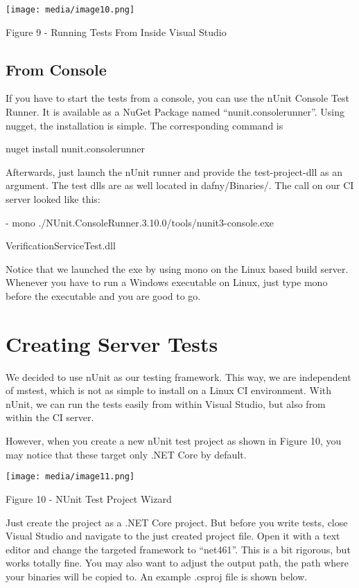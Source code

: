 \documentclass[]{book}
\begin{document}
\texttt{[image: media/image10.png]}

Figure 9 - Running Tests From Inside Visual Studio

\subsection{From Console}\label{from-console}

If you have to start the tests from a console, you can use the nUnit Console Test Runner. It is available as a NuGet Package named ``nunit.consolerunner''. Using nugget, the installation is simple. The corresponding command is

nuget install nunit.consolerunner

Afterwards, just launch the nUnit runner and provide the test-project-dll as an argument. The test dlls are as well located in dafny/Binaries/. The call on our CI server looked like this:

- mono ./NUnit.ConsoleRunner.3.10.0/tools/nunit3-console.exe

VerificationServiceTest.dll

Notice that we launched the exe by using mono on the Linux based build server. Whenever you have to run a Windows executable on Linux, just type mono before the executable and you are good to go.

\section{Creating Server Tests}\label{creating-server-tests}

We decided to use nUnit as our testing framework. This way, we are independent of mstest, which is not as simple to install on a Linux CI environment. With nUnit, we can run the tests easily from within Visual Studio, but also from within the CI server.

However, when you create a new nUnit test project as shown in Figure 10, you may notice that these target only .NET Core by default.

\texttt{[image: media/image11.png]}

\protect\hypertarget{_Ref26950798}{}{}Figure 10 - NUnit Test Project Wizard

Just create the project as a .NET Core project. But before you write tests, close Visual Studio and navigate to the just created project file. Open it with a text editor and change the targeted framework to ``net461''. This is a bit rigorous, but works totally fine. You may also want to adjust the output path, the path where your binaries will be copied to. An example .csproj file is shown below.
\end{document}
